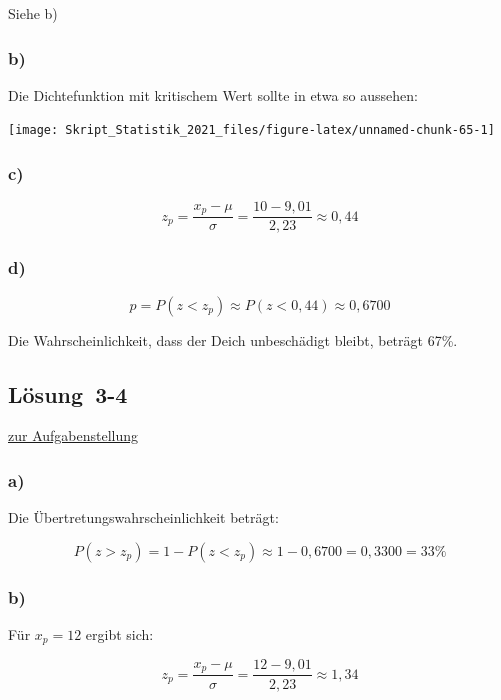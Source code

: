 \documentclass[
  11pt,
  ngerman,
  a4paper,
]{report}
\begin{document}
Siehe b)

\hypertarget{b-10}{%
\subsubsection{b)}\label{b-10}}

Die Dichtefunktion mit kritischem Wert sollte in etwa so aussehen:

\begin{center}\texttt{[image: Skript\_Statistik\_2021\_files/figure-latex/unnamed-chunk-65-1]} \end{center}

\hypertarget{c-8}{%
\subsubsection{c)}\label{c-8}}

\[z_p=\frac{x_p- \mu}{\sigma} = \frac{10-9,01}{2,23}\approx0,44\]

\hypertarget{d-3}{%
\subsubsection{d)}\label{d-3}}

\[p=P(z<z_p)\approx P(z<0,44)\approx0,6700\]

Die Wahrscheinlichkeit, dass der Deich unbeschädigt bleibt, beträgt 67\%.

\hypertarget{loesung-3-4}{%
\subsection{Lösung~3-4}\label{loesung-3-4}}

\protect\hyperlink{aufgabe-3-4}{zur Aufgabenstellung}

\hypertarget{a-11}{%
\subsubsection{a)}\label{a-11}}

Die Übertretungswahrscheinlichkeit beträgt:

\[P(z>z_p) = 1- P(z<z_p) \approx 1-0,6700 = 0,3300 = 33\% \]

\hypertarget{b-11}{%
\subsubsection{b)}\label{b-11}}

Für \(x_p=12\) ergibt sich:

\[ z_p=\frac{x_p- \mu}{\sigma} = \frac{12-9,01}{2,23}\approx1,34 \]
\end{document}

